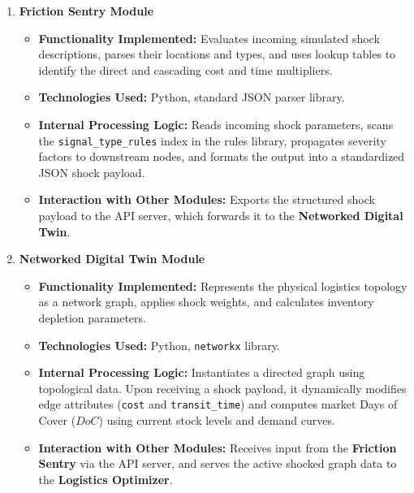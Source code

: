 \begin{enumerate}[label=\Roman*.]
    \item \textbf{Friction Sentry Module}
    \begin{itemize}
        \item \textbf{Functionality Implemented:} Evaluates incoming simulated shock descriptions, parses their locations and types, and uses lookup tables to identify the direct and cascading cost and time multipliers.
        \item \textbf{Technologies Used:} Python, standard JSON parser library.
        \item \textbf{Internal Processing Logic:} Reads incoming shock parameters, scans the \texttt{signal\_type\_rules} index in the rules library, propagates severity factors to downstream nodes, and formats the output into a standardized JSON shock payload.
        \item \textbf{Interaction with Other Modules:} Exports the structured shock payload to the API server, which forwards it to the \textbf{Networked Digital Twin}.
    \end{itemize}

    \item \textbf{Networked Digital Twin Module}
    \begin{itemize}
        \item \textbf{Functionality Implemented:} Represents the physical logistics topology as a network graph, applies shock weights, and calculates inventory depletion parameters.
        \item \textbf{Technologies Used:} Python, \texttt{networkx} library.
        \item \textbf{Internal Processing Logic:} Instantiates a directed graph using topological data. Upon receiving a shock payload, it dynamically modifies edge attributes (\texttt{cost} and \texttt{transit\_time}) and computes market Days of Cover ($DoC$) using current stock levels and demand curves.
        \item \textbf{Interaction with Other Modules:} Receives input from the \textbf{Friction Sentry} via the API server, and serves the active shocked graph data to the \textbf{Logistics Optimizer}.
    \end{itemize}


\end{enumerate}
